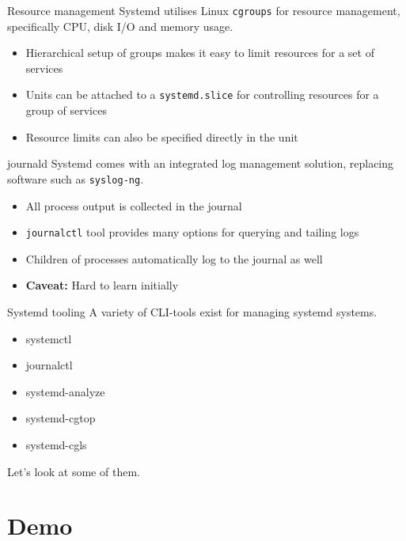 \documentclass[12pt]{beamer}
\newenvironment{code}{\ttfamily}{\par}
\begin{document}
\begin{frame}{Resource management}
  Systemd utilises Linux \texttt{cgroups} for resource management, specifically CPU, disk I/O and memory usage.

  \begin{itemize}
  \item Hierarchical setup of groups makes it easy to limit resources for a set of services
  \item Units can be attached to a \texttt{systemd.slice} for controlling resources for a group of services
  \item Resource limits can also be specified directly in the unit
  \end{itemize}
\end{frame}

\begin{frame}{journald}
  Systemd comes with an integrated log management solution, replacing software such as \texttt{syslog-ng}.
  \begin{itemize}
  \item All process output is collected in the journal
  \item \texttt{journalctl} tool provides many options for querying and tailing logs
  \item Children of processes automatically log to the journal as well
  \item \textbf{Caveat:} Hard to learn initially
  \end{itemize}
\end{frame}

\begin{frame}{Systemd tooling}
  A variety of CLI-tools exist for managing systemd systems.
  \begin{code}
    \begin{itemize}
    \item systemctl
    \item journalctl
    \item systemd-analyze
    \item systemd-cgtop
    \item systemd-cgls
    \end{itemize}
  \end{code}

  Let's look at some of them.
\end{frame}

\section{Demo}
\end{document}
